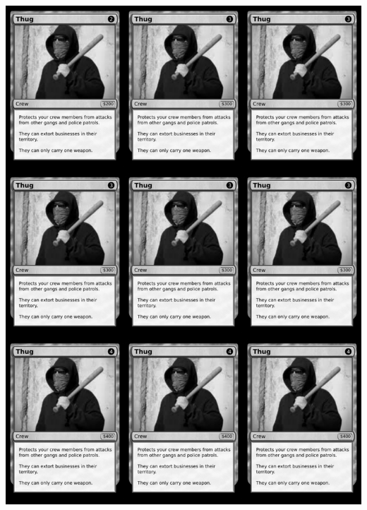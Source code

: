 \documentclass[a4paper]{article}
\begin{document}
\begin{center}
	\centering
	\includegraphics[width=190.5mm,height=266.7mm]{output/temp/page17.png}
\end{center}

\newpage
\end{document}

